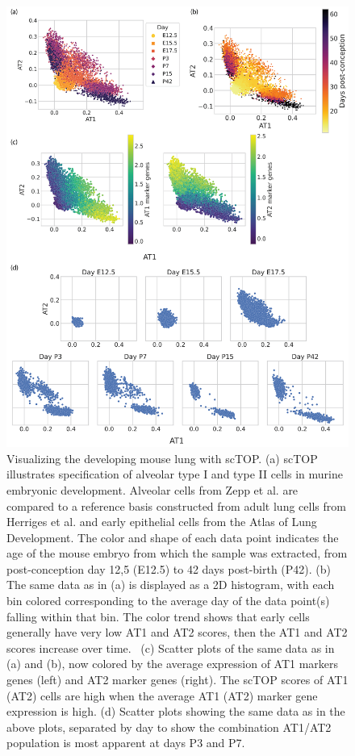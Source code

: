 \documentclass[aps,superscriptaddress, notitlepage,longbibliography]{revtex4-1}
\begin{document}
\begin{figure}
	\centering
		\includegraphics[scale=0.7]{figs/LungMAP.png}
	\caption{Visualizing the developing mouse lung with scTOP. (a) scTOP illustrates specification of alveolar type I and type II cells in murine embryonic development. Alveolar cells from Zepp et al. are compared to a reference basis constructed from adult lung cells from Herriges et al. and early epithelial cells from the Atlas of Lung Development. The color and shape of each data point indicates the age of the mouse embryo from which the sample was extracted, from post-conception day 12,5 (E12.5) to 42 days post-birth (P42). (b) The same data as in (a) is displayed as a 2D histogram, with each bin colored corresponding to the average day of the data point(s) falling within that bin. The color trend shows that early cells generally have very low AT1 and AT2 scores, then the AT1 and AT2 scores increase over time.  (c) Scatter plots of the same data as in (a) and (b), now colored by the average expression of AT1 markers genes (left) and AT2 marker genes (right). The scTOP scores of AT1 (AT2) cells are high when the average AT1 (AT2) marker gene expression is high. (d) Scatter plots showing the same data as in the above plots, separated by day to show the combination AT1/AT2 population is most apparent at days P3 and P7.}
	\label{LungMAP}
\end{figure}
\end{document}
